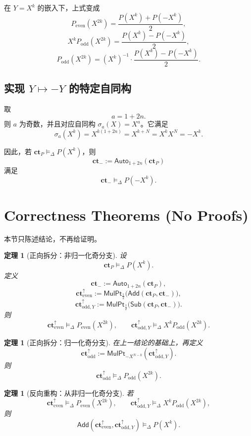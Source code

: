 \documentclass[11pt,a4paper]{ctexart}
\newcommand{\Auto}[1]{\mathsf{Auto}_{#1}}
\newcommand{\Add}{\mathsf{Add}}
\newcommand{\Sub}{\mathsf{Sub}}
\newcommand{\MulPt}[1]{\mathsf{MulPt}_{#1}}
\newcommand{\rep}{\mathrel{\vDash_{\Delta}}}
\newcommand{\ctP}{\mathbf{ct}_{P}}
\newcommand{\ctm}{\mathbf{ct}_{-}}
\newcommand{\cte}{\mathbf{ct}_{\mathrm{even}}^{\uparrow}}
\newcommand{\ctoy}{\mathbf{ct}_{\mathrm{odd},Y}^{\uparrow}}
\newcommand{\cto}{\mathbf{ct}_{\mathrm{odd}}^{\uparrow}}
\newcommand{\Pe}{P_{\mathrm{even}}}
\newcommand{\Po}{P_{\mathrm{odd}}}
\newtheorem{theorem}[definition]{定理}
\begin{document}
在 \(Y=X^k\) 的嵌入下，上式变成
\begin{equation}
\Pe(X^{2k})=\frac{P(X^k)+P(-X^k)}{2}, \label{eq:even-formula-X}
\end{equation}
\begin{equation}
X^k\Po(X^{2k})=\frac{P(X^k)-P(-X^k)}{2}, \label{eq:odd-formula-X-y}
\end{equation}
\begin{equation}
\Po(X^{2k})=(X^k)^{-1}\cdot \frac{P(X^k)-P(-X^k)}{2}. \label{eq:odd-formula-X}
\end{equation}

\subsection{实现 \(Y\mapsto -Y\) 的特定自同构}

取
\begin{equation}
a=1+2n. \label{eq:a-index}
\end{equation}
则 \(a\) 为奇数，并且对应自同构 \(\sigma_a(X)=X^a\)。它满足
\begin{equation}
\sigma_a(X^k)=X^{k(1+2n)}=X^{k+N}=X^kX^N=-X^k. \label{eq:auto-y}
\end{equation}

因此，若 \(\ctP\rep P(X^k)\)，则
\[
\ctm:=\Auto{1+2n}(\ctP)
\]
满足
\[
\ctm \rep P(-X^k).
\]

\section{Correctness Theorems (No Proofs)}

本节只陈述结论，不再给证明。

\begin{theorem}[正向拆分：非归一化奇分支]
设
\[
\ctP\rep P(X^k).
\]
定义
\[
\ctm:=\Auto{1+2n}(\ctP),
\]
\[
\cte:=\MulPt{\frac12}\!\bigl(\Add(\ctP,\ctm)\bigr),
\]
\[
\ctoy:=\MulPt{\frac12}\!\bigl(\Sub(\ctP,\ctm)\bigr).
\]
则
\[
\cte \rep \Pe(X^{2k}),
\qquad
\ctoy \rep X^k\Po(X^{2k}).
\]
\end{theorem}

\begin{theorem}[正向拆分：归一化奇分支]
在上一结论的基础上，再定义
\[
\cto:=\MulPt{-X^{N-k}}(\ctoy).
\]
则
\[
\cto \rep \Po(X^{2k}).
\]
\end{theorem}

\begin{theorem}[反向重构：从非归一化奇分支]
若
\[
\cte \rep \Pe(X^{2k}),
\qquad
\ctoy \rep X^k\Po(X^{2k}),
\]
则
\[
\Add(\cte,\ctoy)\rep P(X^k).
\]
\end{theorem}
\end{document}
